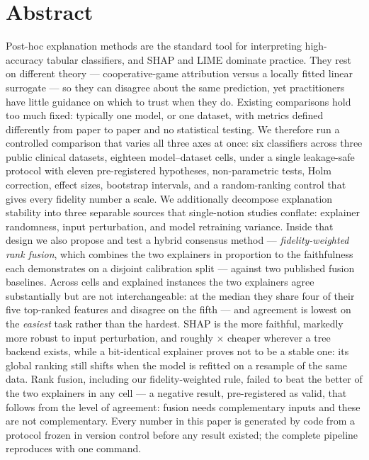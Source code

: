 \chapter*{Abstract}
Post-hoc explanation methods are the standard tool for interpreting high-accuracy
tabular classifiers, and SHAP and LIME dominate practice. They rest on different theory
--- cooperative-game attribution versus a locally fitted linear surrogate --- so they
can disagree about the same prediction, yet practitioners have little guidance on which
to trust when they do. Existing comparisons hold too much fixed: typically one model, or
one dataset, with metrics defined differently from paper to paper and no statistical
testing. We therefore run a controlled comparison that varies all three axes at once:
six classifiers across three public clinical datasets, eighteen model--dataset cells,
under a single leakage-safe protocol with eleven pre-registered hypotheses,
non-parametric tests, Holm correction, effect sizes, bootstrap intervals, and a
random-ranking control that gives every fidelity number a scale. We additionally
decompose explanation stability into three separable sources that single-notion studies
conflate: explainer randomness, input perturbation, and model retraining variance.
Inside that design we also propose and test a hybrid consensus method ---
\emph{fidelity-weighted rank fusion}, which combines the two explainers in proportion to
the faithfulness each demonstrates on a disjoint calibration split --- against two
published fusion baselines. Across \NumCells{} cells and \NumExplained{} explained
instances the two explainers agree substantially but are not interchangeable: at the
median they share four of their five top-ranked features and disagree on the fifth ---
and agreement is lowest on the \emph{easiest} task rather than the hardest. SHAP is the
more faithful, markedly more robust to input perturbation, and roughly
\SpeedFactor{}$\times$ cheaper wherever a tree backend exists, while a bit-identical
explainer proves not to be a stable one: its global ranking still shifts when the model
is refitted on a resample of the same data. Rank fusion, including our fidelity-weighted
rule, failed to beat the better of the two explainers in any cell --- a negative result,
pre-registered as valid, that follows from the level of agreement: fusion needs
complementary inputs and these are not complementary. Every number in this paper is
generated by code from a protocol frozen in version control before any result existed;
the complete pipeline reproduces with one command.
